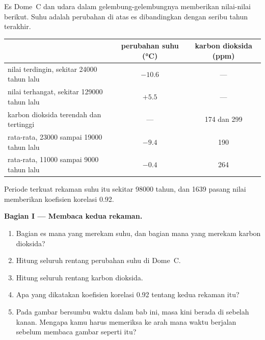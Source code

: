 \begin{problem}
\label{pb:g12:past-climates:1}
Es Dome~C dan udara dalam gelembung-gelembungnya memberikan nilai-nilai berikut.
Suhu adalah perubahan di atas es dibandingkan dengan seribu tahun terakhir.

\begin{center}
\small
\begin{tabular}{|l|c|c|}
\hline
 & \textbf{perubahan suhu (\unit{\degreeCelsius})} & \textbf{karbon dioksida (ppm)} \\
\hline
nilai terdingin, sekitar \num{24000} tahun lalu & $-10.6$ & --- \\
nilai terhangat, sekitar \num{129000} tahun lalu & $+5.5$ & --- \\
karbon dioksida terendah dan tertinggi & --- & 174 dan 299 \\
rata-rata, \num{23000} sampai \num{19000} tahun lalu & $-9.4$ & 190 \\
rata-rata, \num{11000} sampai \num{9000} tahun lalu & $-0.4$ & 264 \\
\hline
\end{tabular}
\end{center}

Periode terkuat rekaman suhu itu sekitar \num{98000} tahun, dan 1639 pasang
nilai memberikan koefisien korelasi 0.92.

\medskip
\noindent\textbf{Bagian I --- Membaca kedua rekaman.}
\begin{enumerate}
  \item Bagian es mana yang merekam suhu, dan bagian mana yang merekam karbon
        dioksida?
  \item Hitung seluruh rentang perubahan suhu di Dome~C.
  \item Hitung seluruh rentang karbon dioksida.
  \item Apa yang dikatakan koefisien korelasi 0.92 tentang kedua rekaman itu?
  \item Pada gambar bersumbu waktu dalam bab ini, masa kini berada di sebelah
        kanan. Mengapa kamu harus memeriksa ke arah mana waktu berjalan
        sebelum membaca gambar seperti itu?
\end{enumerate}


\end{problem}
